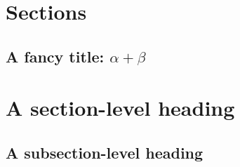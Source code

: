 \section{Sections}
\label{sec:sections}
\lipsum[1-1]

\subsection{A fancy title: $\alpha+\beta$}
\lipsum[2-2]

\section*{A section-level heading}
\lipsum[3-3]

\subsection*{A subsection-level heading}
\lipsum[4-4]

